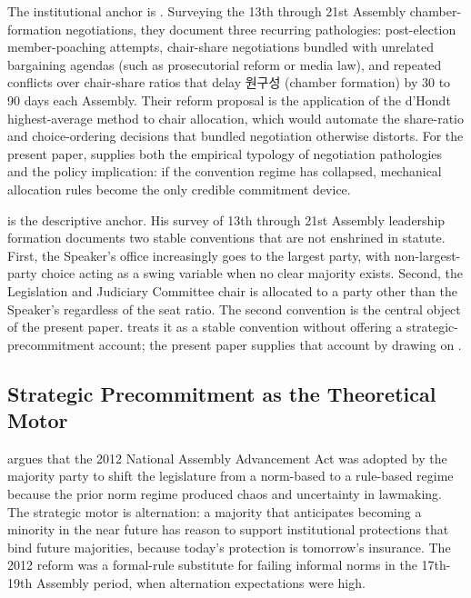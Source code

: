 \documentclass[11pt]{article}
\begin{document}
The institutional anchor is \citet{leekim2022}. Surveying the 13th through 21st Assembly chamber-formation negotiations, they document three recurring pathologies: post-election member-poaching attempts, chair-share negotiations bundled with unrelated bargaining agendas (such as prosecutorial reform or media law), and repeated conflicts over chair-share ratios that delay 원구성 (chamber formation) by 30 to 90 days each Assembly. Their reform proposal is the application of the d'Hondt highest-average method to chair allocation, which would automate the share-ratio and choice-ordering decisions that bundled negotiation otherwise distorts. For the present paper, \citet{leekim2022} supplies both the empirical typology of negotiation pathologies and the policy implication: if the convention regime has collapsed, mechanical allocation rules become the only credible commitment device.

\citet{jung2018} is the descriptive anchor. His survey of 13th through 21st Assembly leadership formation documents two stable conventions that are not enshrined in statute. First, the Speaker's office increasingly goes to the largest party, with non-largest-party choice acting as a swing variable when no clear majority exists. Second, the Legislation and Judiciary Committee chair is allocated to a party other than the Speaker's regardless of the seat ratio. The second convention is the central object of the present paper. \citet{jung2018} treats it as a stable convention without offering a strategic-precommitment account; the present paper supplies that account by drawing on \citet{jeong2023}.

\subsection{Strategic Precommitment as the Theoretical Motor}

\citet{jeong2023} argues that the 2012 National Assembly Advancement Act was adopted by the majority party to shift the legislature from a norm-based to a rule-based regime because the prior norm regime produced chaos and uncertainty in lawmaking. The strategic motor is alternation: a majority that anticipates becoming a minority in the near future has reason to support institutional protections that bind future majorities, because today's protection is tomorrow's insurance. The 2012 reform was a formal-rule substitute for failing informal norms in the 17th-19th Assembly period, when alternation expectations were high.
\end{document}
